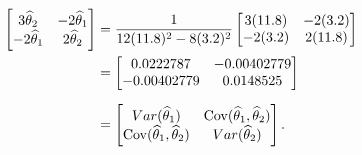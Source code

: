 \begin{solution}
\begin{align*}
\begin{bmatrix}
            3\widehat{\theta}_2 & -2\widehat{\theta}_1 \\
            -2\widehat{\theta}_1 & 2\widehat{\theta}_2
        \end{bmatrix}
        &= \frac{1}{12(11.8)^2 - 8(3.2)^2} \begin{bmatrix}
            3(11.8) & -2(3.2) \\
            -2(3.2) & 2(11.8)
        \end{bmatrix}\\ 
        &= \begin{bmatrix}
            0.0222787 & -0.00402779 \\
            -0.00402779 & 0.0148525
        \end{bmatrix}\\[0.6em]
        &= \begin{bmatrix}
            Var(\widehat{\theta}_1) & \operatorname*{Cov}(\widehat{\theta}_1, \widehat{\theta}_2)\\
            \operatorname*{Cov}(\widehat{\theta}_1, \widehat{\theta}_2) & Var(\widehat{\theta}_2)
        \end{bmatrix}.
    \end{align*}


\end{solution}
